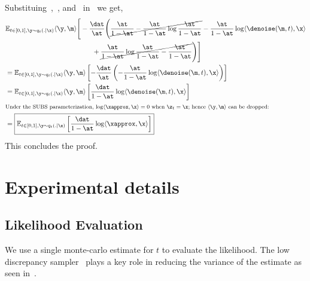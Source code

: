 \documentclass{article} %
\def\method{SUBS}
\begin{document}
{\begin{appendices}
Substituing~,~, and~ in~ we get,
\begin{align}\label{eqn:eqn:sedd_elbo_masked}
    & \mathbb{E}_{t \in [0, 1], \y \sim q_t(. | \x)}
        \langle \y, \m \rangle \Bigg[- \frac{\dat}{\at} \Bigg(
        \cancel{\frac{\at}{1 - \at}
        - \frac{\at}{1 - \at}\log \frac{\at}{1 - \at}}
        - \frac{\at}{1 - \at}\log \langle \denoise(\m, t), \x \rangle \nonumber \\
    & \hspace{4.5cm} + \cancel{\frac{\at}{1 - \at} \log \frac{\at}{1 - \at} - \frac{\at}{1 - \at}}
        \Bigg) \Bigg] \nonumber \\
    & = \mathbb{E}_{t \in [0, 1], \y \sim q_t(. | \x)}
        \langle \y, \m \rangle \left[- \frac{\dat}{\at} \left(
        - \frac{\at}{1 - \at}\log \langle \denoise(\m, t), \x \rangle
        \right) \right]  \nonumber \\
    & = \mathbb{E}_{t \in [0, 1], \y \sim q_t(. | \x)}
        \langle \y, \m \rangle \left[\frac{\dat}{1 - \at}\log \langle \denoise(\m, t), \x \rangle \right] \nonumber \\
    & \text{\footnotesize Under the \method{} parameterization, $\log \langle \xapprox, \x \rangle = 0$ when $\z_t = \x$; hence $\langle \y, \m \rangle$ can be dropped:} \nonumber \\
    & = \boxed{\mathbb{E}_{t \in [0, 1], \y \sim q_t(. | \x)}
         \left[\frac{\dat}{1 - \at}\log \langle \xapprox, \x \rangle \right] }
\end{align}
This concludes the proof.











\section{Experimental details}

\subsection{Likelihood Evaluation}\label{supp:sec:likelihood-eval}
We use a single monte-carlo estimate for $t$ to evaluate the likelihood. The low discrepancy sampler~ plays a key role in reducing the variance of the estimate as seen in~.


\end{appendices}}
\end{document}
